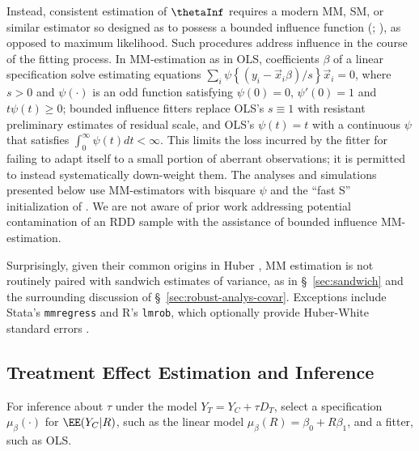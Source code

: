 Instead, consistent estimation of $\thetaInf$ requires a modern MM,  SM, or similar estimator so designed
 as to possess a bounded influence function (\citealp[Thm.~3]{he1991localbreakdown};
\citealp{yohaiZamar1997locallyrobustMestimates}), as opposed to
maximum likelihood.
Such procedures address influence in the course of the fitting process.
 In MM-estimation as in OLS,
coefficients $\beta$ of a linear specification solve estimating equations
$\sum_{i} \psi\left\{ ({y}_{i} -
\vec{x}_{i}\beta)/s \right\} \vec{x}_{i} =0$, where $s>0$ and
$\psi(\cdot)$ is an odd function satisfying $\psi(0)=0$,
$\psi'(0)=1$ and $t\psi(t)\geq 0$; bounded influence fitters replace OLS's $s\equiv 1$ with resistant preliminary
estimates of residual scale, and OLS's $\psi(t) = t$ with a continuous $\psi$
that satisfies $\int_{0}^{\infty}\psi(t)dt < \infty$. This limits
the loss incurred by the fitter for failing to adapt itself to a small
portion of aberrant observations;
it is permitted to instead systematically down-weight them.
The analyses and simulations presented below use MM-estimators with bisquare $\psi$ and
the ``fast S'' initialization of \citet{salibian-barreraYohai2006fastS}.
We are not aware of prior work addressing
potential contamination of an RDD sample with the assistance of
bounded influence MM-estimation.

Surprisingly, given their common origins in %
Huber \citeyearpar{huber1964robust}, MM estimation is not routinely
paired with sandwich estimates of variance, as in \S~\ref{sec:sandwich} and
the surrounding discussion of \S~\ref{sec:robust-analys-covar}.
Exceptions include Stata's \texttt{mmregress} and R's \texttt{lmrob},
which optionally provide Huber-White standard errors
\citep{verardiCroux2009robust,rousseuwetal2015robustbase}.




\subsection{Treatment Effect Estimation and Inference}
\label{sec:test-hypoth-no}

For inference about $\tau$ under the model
$Y_{T} = Y_{C} + \tau D_{T}$, select a specification
$\mu_{\beta}(\cdot)$ for $\EE(Y_{C}| R)$, %
such as the
linear model $\mu_{\beta}(R) =\beta_{0} + R\beta_{1}$, and a fitter,
such as OLS.

